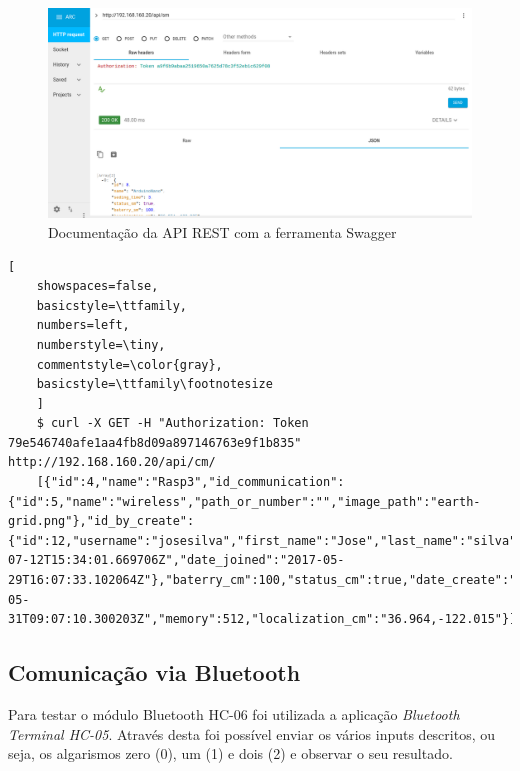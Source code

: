 \begin{figure}[h]
	\centering
	\includegraphics[width=0.7\linewidth]{prints-web/API_teste1.png}
	\caption{Documentação da API REST com a ferramenta Swagger}
	\label{testgrap}
\end{figure}







	\begin{lstlisting}[
	showspaces=false,
	basicstyle=\ttfamily,
	numbers=left,
	numberstyle=\tiny,
	commentstyle=\color{gray},
	basicstyle=\ttfamily\footnotesize
	]
	$ curl -X GET -H "Authorization: Token  79e546740afe1aa4fb8d09a897146763e9f1b835" http://192.168.160.20/api/cm/
	[{"id":4,"name":"Rasp3","id_communication":{"id":5,"name":"wireless","path_or_number":"","image_path":"earth-grid.png"},"id_by_create":{"id":12,"username":"josesilva","first_name":"Jose","last_name":"silva","email":"ruipedrooliveira@ua.pt","last_login":"2017-07-12T15:34:01.669706Z","date_joined":"2017-05-29T16:07:33.102064Z"},"baterry_cm":100,"status_cm":true,"date_create":"2017-05-31T09:07:10.300203Z","memory":512,"localization_cm":"36.964,-122.015"}]
	\end{lstlisting}
	
	


\subsection{Comunicação via Bluetooth }


Para testar o módulo Bluetooth HC-06 foi utilizada a aplicação \textit{Bluetooth Terminal HC-05}. Através desta foi possível enviar os vários inputs descritos, ou seja,  os algarismos zero (0), um (1) e dois (2) e observar o seu resultado.  

